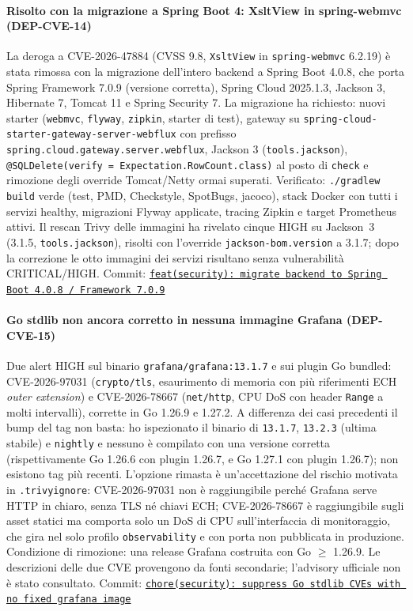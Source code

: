 ﻿\documentclass[a4paper,12pt]{report}
\newcommand{\commitref}[2]{\texttt{\small \href{https://github.com/diegoandruccioli/hotel-pms/commit/#1}{#2}}}
\begin{document}
\paragraph{Risolto con la migrazione a Spring Boot 4: XsltView in spring-webmvc (DEP-CVE-14)}
La deroga a CVE-2026-47884 (CVSS 9.8, \texttt{XsltView} in \texttt{spring-webmvc} 6.2.19) è stata
rimossa con la migrazione dell'intero backend a Spring Boot 4.0.8, che porta
Spring Framework 7.0.9 (versione corretta), Spring Cloud 2025.1.3, Jackson 3,
Hibernate 7, Tomcat 11 e Spring Security 7. La migrazione ha richiesto: nuovi
starter (\texttt{webmvc}, \texttt{flyway}, \texttt{zipkin}, starter di test),
gateway su \texttt{spring-cloud-starter-gateway-server-webflux} con prefisso
\texttt{spring.cloud.gateway.server.webflux}, Jackson 3 (\texttt{tools.jackson}),
\texttt{@SQLDelete(verify = Expectation.RowCount.class)} al posto di
\texttt{check} e rimozione degli override Tomcat/Netty ormai superati.
Verificato: \texttt{./gradlew build} verde (test, PMD, Checkstyle, SpotBugs, jacoco),
stack Docker con tutti i servizi healthy, migrazioni Flyway applicate, tracing
Zipkin e target Prometheus attivi. Il rescan Trivy delle immagini ha rivelato cinque HIGH su Jackson~3 (3.1.5, \texttt{tools.jackson}), risolti con l'override \texttt{jackson-bom.version} a 3.1.7; dopo la correzione le otto immagini dei servizi risultano senza vulnerabilit\`a CRITICAL/HIGH.
Commit: \commitref{7256d859}{feat(security): migrate backend to Spring Boot 4.0.8 / Framework 7.0.9}

\paragraph{Go stdlib non ancora corretto in nessuna immagine Grafana (DEP-CVE-15)}
Due alert HIGH sul binario \texttt{grafana/grafana:13.1.7} e sui plugin Go
bundled: CVE-2026-97031 (\texttt{crypto/tls}, esaurimento di memoria con più
riferimenti ECH \emph{outer extension}) e CVE-2026-78667 (\texttt{net/http},
CPU DoS con header \texttt{Range} a molti intervalli), corrette in Go 1.26.9 e
1.27.2. A differenza dei casi precedenti il bump del tag non basta: ho ispezionato
il binario di \texttt{13.1.7}, \texttt{13.2.3} (ultima stabile) e \texttt{nightly}
e nessuno è compilato con una versione corretta (rispettivamente Go 1.26.6 con
plugin 1.26.7, e Go 1.27.1 con plugin 1.26.7); non esistono tag più recenti.
L'opzione rimasta è un'accettazione del rischio motivata in
\texttt{.trivyignore}: CVE-2026-97031 non è raggiungibile perché Grafana serve
HTTP in chiaro, senza TLS né chiavi ECH; CVE-2026-78667 è raggiungibile sugli
asset statici ma comporta solo un DoS di CPU sull'interfaccia di monitoraggio,
che gira nel solo profilo \texttt{observability} e con porta non pubblicata in
produzione. Condizione di rimozione: una release Grafana costruita con Go
$\geq$ 1.26.9. Le descrizioni delle due CVE provengono da fonti secondarie;
l'advisory ufficiale non è stato consultato.
Commit: \commitref{7a82202}{chore(security): suppress Go stdlib CVEs with no fixed grafana image}
\end{document}
